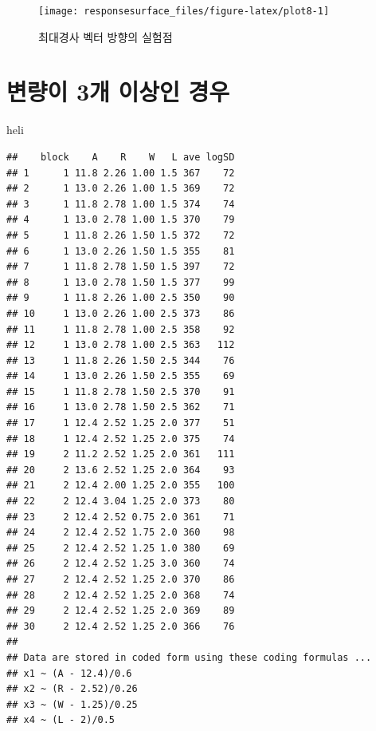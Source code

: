 \documentclass[
]{book}
\newenvironment{Shaded}{\begin{snugshade}}{\end{snugshade}}
\newcommand{\NormalTok}[1]{#1}
\theoremstyle{definition}
\theoremstyle{definition}
\theoremstyle{definition}
\theoremstyle{definition}
\theoremstyle{remark}
\begin{document}
\begin{figure}

{\centering \texttt{[image: responsesurface\_files/figure-latex/plot8-1]} 

}

\caption{최대경사 벡터 방향의 실험점}\label{fig:plot8}
\end{figure}

\hypertarget{uxbcc0uxb7c9uxc774-3uxac1c-uxc774uxc0c1uxc778-uxacbduxc6b0}{%
\section{변량이 3개 이상인 경우}\label{uxbcc0uxb7c9uxc774-3uxac1c-uxc774uxc0c1uxc778-uxacbduxc6b0}}

\begin{Shaded}
\begin{Highlighting}[]
\NormalTok{heli}
\end{Highlighting}
\end{Shaded}

\begin{verbatim}
##    block    A    R    W   L ave logSD
## 1      1 11.8 2.26 1.00 1.5 367    72
## 2      1 13.0 2.26 1.00 1.5 369    72
## 3      1 11.8 2.78 1.00 1.5 374    74
## 4      1 13.0 2.78 1.00 1.5 370    79
## 5      1 11.8 2.26 1.50 1.5 372    72
## 6      1 13.0 2.26 1.50 1.5 355    81
## 7      1 11.8 2.78 1.50 1.5 397    72
## 8      1 13.0 2.78 1.50 1.5 377    99
## 9      1 11.8 2.26 1.00 2.5 350    90
## 10     1 13.0 2.26 1.00 2.5 373    86
## 11     1 11.8 2.78 1.00 2.5 358    92
## 12     1 13.0 2.78 1.00 2.5 363   112
## 13     1 11.8 2.26 1.50 2.5 344    76
## 14     1 13.0 2.26 1.50 2.5 355    69
## 15     1 11.8 2.78 1.50 2.5 370    91
## 16     1 13.0 2.78 1.50 2.5 362    71
## 17     1 12.4 2.52 1.25 2.0 377    51
## 18     1 12.4 2.52 1.25 2.0 375    74
## 19     2 11.2 2.52 1.25 2.0 361   111
## 20     2 13.6 2.52 1.25 2.0 364    93
## 21     2 12.4 2.00 1.25 2.0 355   100
## 22     2 12.4 3.04 1.25 2.0 373    80
## 23     2 12.4 2.52 0.75 2.0 361    71
## 24     2 12.4 2.52 1.75 2.0 360    98
## 25     2 12.4 2.52 1.25 1.0 380    69
## 26     2 12.4 2.52 1.25 3.0 360    74
## 27     2 12.4 2.52 1.25 2.0 370    86
## 28     2 12.4 2.52 1.25 2.0 368    74
## 29     2 12.4 2.52 1.25 2.0 369    89
## 30     2 12.4 2.52 1.25 2.0 366    76
## 
## Data are stored in coded form using these coding formulas ...
## x1 ~ (A - 12.4)/0.6
## x2 ~ (R - 2.52)/0.26
## x3 ~ (W - 1.25)/0.25
## x4 ~ (L - 2)/0.5
\end{verbatim}
\end{document}
